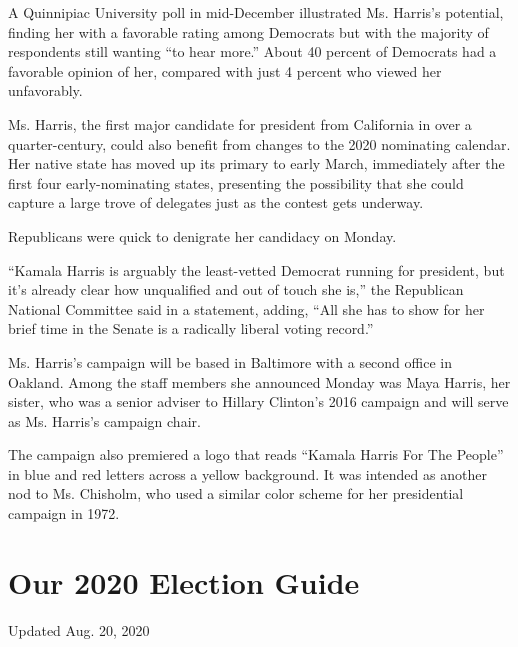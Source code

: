 A Quinnipiac University poll in mid-December illustrated Ms. Harris's
potential, finding her with a favorable rating among Democrats but with
the majority of respondents still wanting ``to hear more.'' About 40
percent of Democrats had a favorable opinion of her, compared with just
4 percent who viewed her unfavorably.

Ms. Harris, the first major candidate for president from California in
over a quarter-century, could also benefit from changes to the 2020
nominating calendar. Her native state has moved up its primary to early
March, immediately after the first four early-nominating states,
presenting the possibility that she could capture a large trove of
delegates just as the contest gets underway.

Republicans were quick to denigrate her candidacy on Monday.

``Kamala Harris is arguably the least-vetted Democrat running for
president, but it's already clear how unqualified and out of touch she
is,'' the Republican National Committee said in a statement, adding,
``All she has to show for her brief time in the Senate is a radically
liberal voting record.''

Ms. Harris's campaign will be based in Baltimore with a second office in
Oakland. Among the staff members she announced Monday was Maya Harris,
her sister, who was a senior adviser to Hillary Clinton's 2016 campaign
and will serve as Ms. Harris's campaign chair.

The campaign also premiered a logo that reads ``Kamala Harris For The
People'' in blue and red letters across a yellow background. It was
intended as another nod to Ms. Chisholm, who used a similar color scheme
for her presidential campaign in 1972.

\hypertarget{our-2020-election-guide}{%
\section{Our 2020 Election Guide}\label{our-2020-election-guide}}

Updated Aug. 20, 2020

